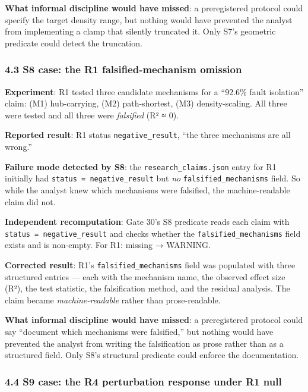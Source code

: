 \documentclass[
]{article}
\begin{document}
\textbf{What informal discipline would have missed}: a preregistered
protocol could specify the target density range, but nothing would have
prevented the analyst from implementing a clamp that silently truncated
it. Only S7's geometric predicate could detect the truncation.

\subsubsection{4.3 S8 case: the R1 falsified-mechanism
omission}\label{s8-case-the-r1-falsified-mechanism-omission}

\textbf{Experiment}: R1 tested three candidate mechanisms for a ``92.6\%
fault isolation'' claim: (M1) hub-carrying, (M2) path-shortest, (M3)
density-scaling. All three were tested and all three were
\emph{falsified} (R² ≈ 0).

\textbf{Reported result}: R1 status \texttt{negative\_result}, ``the
three mechanisms are all wrong.''

\textbf{Failure mode detected by S8}: the \texttt{research\_claims.json}
entry for R1 initially had \texttt{status\ =\ negative\_result} but
\emph{no} \texttt{falsified\_mechanisms} field. So while the analyst
knew which mechanisms were falsified, the machine-readable claim did
not.

\textbf{Independent recomputation}: Gate 30's S8 predicate reads each
claim with \texttt{status\ =\ negative\_result} and checks whether the
\texttt{falsified\_mechanisms} field exists and is non-empty. For R1:
missing → WARNING.

\textbf{Corrected result}: R1's \texttt{falsified\_mechanisms} field was
populated with three structured entries --- each with the mechanism
name, the observed effect size (R²), the test statistic, the
falsification method, and the residual analysis. The claim became
\emph{machine-readable} rather than prose-readable.

\textbf{What informal discipline would have missed}: a preregistered
protocol could say ``document which mechanisms were falsified,'' but
nothing would have prevented the analyst from writing the falsification
as prose rather than as a structured field. Only S8's structural
predicate could enforce the documentation.

\subsubsection{4.4 S9 case: the R4 perturbation response under R1
null}\label{s9-case-the-r4-perturbation-response-under-r1-null}
\end{document}
